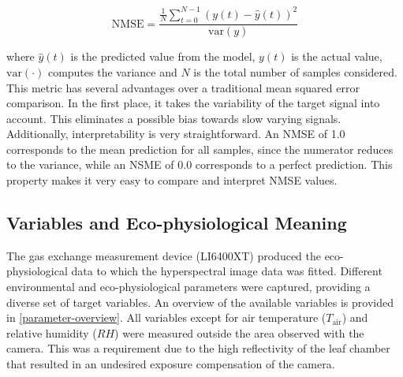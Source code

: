 \documentclass[10pt,authoryear,a4paper]{elsarticle}
\providecommand\ddfrac[2]{\frac{\displaystyle #1}{\displaystyle #2}}
\newcommand{\Tair}{$T_\text{air}$}
\newcommand{\RH}{$RH$}
\begin{document}
        \begin{equation}
            \text{NMSE} = \ddfrac{\frac{1}{N}\sum_{t=0}^{N-1} (y(t)-\hat{y}(t))^2}{\text{var}(y)} 
        \end{equation}
        
        where $\hat{y}(t)$ is the predicted value from the model, $y(t)$ is the actual value, $\text{var}(\cdot)$ computes the variance and $N$ is the total number of samples considered. This metric has several advantages over a traditional mean squared error comparison. In the first place, it takes the variability of the target signal into account. This eliminates a possible bias towards slow varying signals. Additionally, interpretability is very straightforward. An NMSE of 1.0 corresponds to the mean prediction for all samples, since the numerator reduces to the variance, while an NSME of 0.0 corresponds to a perfect prediction. This property makes it very easy to compare and interpret NMSE values.
        
    \subsection{Variables and Eco-physiological Meaning}  
    
        The gas exchange measurement device (LI6400XT) produced the eco-physiological data to which the hyperspectral image data was fitted. Different environmental and eco-physiological parameters were captured, providing a diverse set of target variables. An overview of the available variables is provided in \cref{parameter-overview}. All variables except for air temperature (\Tair) and relative humidity (\RH) were measured outside the area observed with the camera. This was a requirement due to the high reflectivity of the leaf chamber that resulted in an undesired exposure compensation of the camera. 
        
\end{document}
